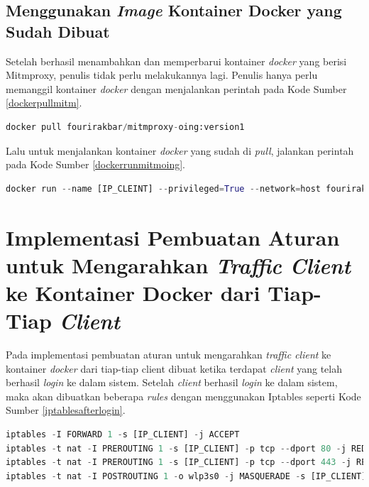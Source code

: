 \subsection{Menggunakan \textit{Image} Kontainer Docker yang Sudah Dibuat}
Setelah berhasil menambahkan dan memperbarui kontainer \textit{docker} yang berisi Mitmproxy, penulis tidak perlu melakukannya lagi. Penulis hanya perlu memanggil kontainer \textit{docker} dengan menjalankan perintah pada Kode Sumber \ref{dockerpullmitm}.
\newline
\begin{lstlisting}[frame=single,tabsize=2,breaklines,captionpos=b,caption=Perintah untuk \textit{Pull Image mitmproxy},language=Python,label=dockerpullmitm]
docker pull fourirakbar/mitmproxy-oing:version1
\end{lstlisting}

Lalu untuk menjalankan kontainer \textit{docker} yang sudah di \textit{pull}, jalankan perintah pada Kode Sumber \ref{dockerrunmitmoing}.
\newline
\begin{lstlisting}[frame=single,tabsize=2,breaklines,captionpos=b,caption=Perintah untuk \textit{Pull Image mitmproxy},language=Python,label=dockerrunmitmoing]
docker run --name [IP_CLEINT] --privileged=True --network=host fourirakbar/mitmproxy-oing:version1
\end{lstlisting}

\section{Implementasi Pembuatan Aturan untuk Mengarahkan \textit{Traffic Client} ke Kontainer Docker dari Tiap-Tiap \textit{Client}}
Pada implementasi pembuatan aturan untuk mengarahkan \textit{traffic client} ke kontainer \textit{docker} dari tiap-tiap client dibuat ketika terdapat \textit{client} yang telah berhasil \textit{login} ke dalam sistem. Setelah \textit{client} berhasil \textit{login} ke dalam sistem, maka akan dibuatkan beberapa \textit{rules} dengan menggunakan Iptables seperti Kode Sumber \ref{iptablesafterlogin}.
\begin{lstlisting}[frame=single,tabsize=2,breaklines,captionpos=b,caption=Command untuk mengarahkan \textit{client} ke halaman \textit{login},language=Python,label=iptablesafterlogin]
iptables -I FORWARD 1 -s [IP_CLIENT] -j ACCEPT
iptables -t nat -I PREROUTING 1 -s [IP_CLIENT] -p tcp --dport 80 -j REDIRECT --to-ports [PORTS_CLIENT]
iptables -t nat -I PREROUTING 1 -s [IP_CLIENT] -p tcp --dport 443 -j REDIRECT --to-ports [PORTS_CLIENT]
iptables -t nat -I POSTROUTING 1 -o wlp3s0 -j MASQUERADE -s [IP_CLIENT]
\end{lstlisting}

